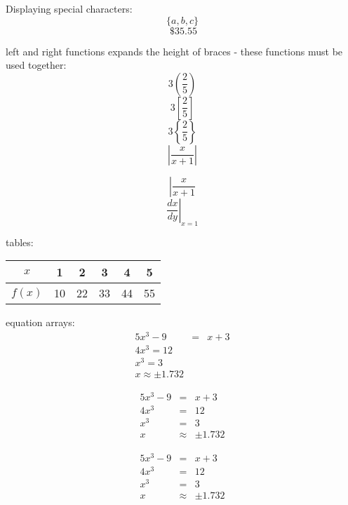 \documentclass[11]{article}
\begin{document}
Displaying special characters:
$$ \{a, b, c\} $$ %
$$ \ \$ 35.55 $$ %

left and right functions expands the height of braces - these functions must be used together:
$$ 3\left(\frac{2}{5}\right) $$
$$ 3\left[\frac{2}{5}\right] $$
$$ 3\left\{\frac{2}{5}\right\} $$
$$ \left|\frac{x}{x+1}\right| $$

$$ \left| \frac{x}{x+1} \right. $$ %
$$ \left. \frac{dx}{dy} \right|_{x = 1} $$ 

tables: %

\begin{tabular}{c|ccccc} 
	$x$ & 1 & 2 & 3 & 4 & 5 \\ 
	\hline %
	$f(x)$ & 10 & 22 & 33 & 44 & 55
\end{tabular}

equation arrays: 
\begin{eqnarray} %
	5x^3 - 9 &=& x + 3 \\
	4x^3 = 12 \\
	x^3 = 3 \\
	x \approx \pm1.732
\end{eqnarray}

\begin{eqnarray} %
	5x^3 - 9 &=& x + 3 \\
	4x^3 &=& 12 \\
	x^3 &=& 3 \\
	x &\approx& \pm1.732
\end{eqnarray}

\begin{eqnarray*} %
	5x^3 - 9 &=& x + 3 \\
	4x^3 &=& 12 \\
	x^3 &=& 3 \\
	x &\approx& \pm1.732
\end{eqnarray*}
\end{document}
